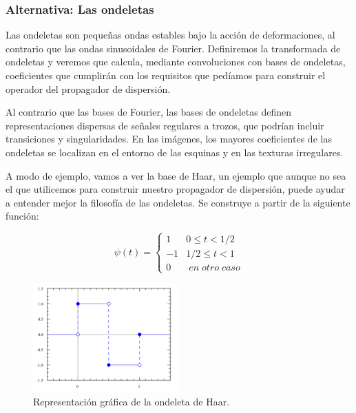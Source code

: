 \medskip

\subsubsection{Alternativa: Las ondeletas}

\noindent Las ondeletas \cite{MallatWavelets} son pequeñas ondas estables bajo la acción de deformaciones, al contrario que las ondas sinusoidales de Fourier. Definiremos la transformada de ondeletas y veremos que calcula, mediante convoluciones con bases de ondeletas, coeficientes que cumplirán con los requisitos que pedíamos para construir el operador del propagador de dispersión.

\medskip

\noindent Al contrario que las bases de Fourier, las bases de ondeletas definen  representaciones dispersas de señales regulares a trozos, que podrían incluir transiciones y singularidades. En las imágenes, los mayores coeficientes de las ondeletas se localizan en el entorno de las esquinas y en las texturas irregulares.

\medskip

\noindent A modo de ejemplo, vamos a ver la base de Haar, un ejemplo que aunque no sea el que utilicemos para construir nuestro propagador de dispersión, puede ayudar a entender mejor la filosofía de las ondeletas. Se construye a partir de la siguiente función: 

$$ \psi(t)= \begin{cases} 
      1 & 0\leq t < 1/2 \\
      -1 & 1/2\leq t < 1 \\
      0 & \; en \; otro \; caso
   \end{cases}$$

\begin{figure}[!h]
  \centering
  \includegraphics[width=0.5\textwidth]{img/Haar_wavelet.png}
  \caption{Representación gráfica de la ondeleta de Haar.}
  \label{fig:Ondeleta_de_Haar}
\end{figure}

